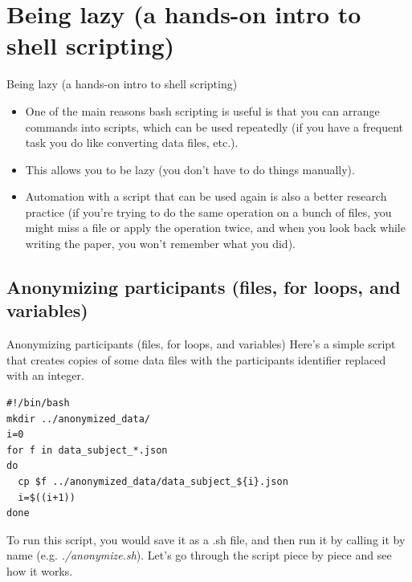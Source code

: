 \documentclass{beamer}
\begin{document}
\section{Being lazy (a hands-on intro to shell scripting)}
\begin{frame}{Being lazy (a hands-on intro to shell scripting)}
\begin{itemize}
\item<1-> One of the main reasons bash scripting is useful is that you can arrange commands into scripts, which can be used repeatedly (if you have a frequent task you do like converting data files, etc.). 
\item<2-> This allows you to be lazy (you don't have to do things manually).
\item<3-> Automation with a script that can be used again is also a better research practice (if you're trying to do the same operation on a bunch of files, you might miss a file or apply the operation twice, and when you look back while writing the paper, you won't remember what you did).
\end{itemize}
\end{frame}


\subsection{Anonymizing participants (files, for loops, and variables)}
\begin{frame}[fragile]{Anonymizing participants (files, for loops, and variables)}
Here's a simple script that creates copies of some data files with the participants identifier replaced with an integer. 
\begin{lstlisting}[title=anonymize.sh]
#!/bin/bash
mkdir ../anonymized_data/
i=0
for f in data_subject_*.json
do
  cp $f ../anonymized_data/data_subject_${i}.json
  i=$((i+1))
done
\end{lstlisting}
To run this script, you would save it as a .sh file, and then run it by calling it by name (e.g. \emph{./anonymize.sh}). Let's go through the script piece by piece and see how it works. 
\end{frame}
\end{document}
